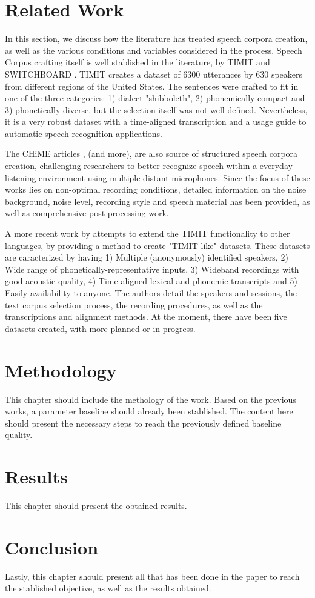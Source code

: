 	\chapter[Related Work]{Related Work}
	
	In this section, we discuss how the literature has treated speech corpora creation, as well as the various conditions and variables considered in the process. Speech Corpus crafting itself is well stablished in the literature, by TIMIT \cite{Lamel1992timmit} and SWITCHBOARD \cite{godfrey1992switchboard}. TIMIT creates a dataset of 6300 utterances by 630 speakers from different regions of the United States. The sentences were crafted to fit in one of the three categories: 1) dialect "shibboleth", 2) phonemically-compact and 3) phonetically-diverse, but the selection itself was not well defined. Nevertheless, it is a very robust dataset with a time-aligned transcription and a usage guide to automatic speech recognition applications.
    
    The CHiME articles \cite{christensen2010chime} \cite{barker2013pascal}, \cite{barker2018fifth} (and more), are also source of structured speech corpora creation, challenging researchers to better recognize speech within a everyday listening environment using multiple distant microphones. Since the focus of these works lies on non-optimal recording conditions, detailed information on the noise background, noise level, recording style and speech material has been provided, as well as comprehensive post-processing work.
    
    A more recent work by \cite{chanchaochai2018globaltimit} attempts to extend the TIMIT functionality to other languages, by providing a method to create "TIMIT-like" datasets. These datasets are caracterized by having 1) Multiple (anonymously) identified speakers, 2) Wide range of phonetically-representative inputs, 3) Wideband recordings with good acoustic quality, 4) Time-aligned lexical and phonemic transcripts and 5) Easily availability to anyone. The authors detail the speakers and sessions, the text corpus selection process, the recording procedures, as well as the transcriptions and alignment methods. At the moment, there have been five datasets created, with more planned or in progress.

	\chapter[Methodology]{Methodology}
	
    This chapter should include the methology of the work. Based on the previous works, a parameter baseline should already been stablished. The content here should present the necessary steps to reach the previously defined baseline quality.

    \chapter{Results}

    This chapter should present the obtained results.

	\chapter{Conclusion}

    Lastly, this chapter should present all that has been done in the paper to reach the stablished objective, as well as the results obtained.
